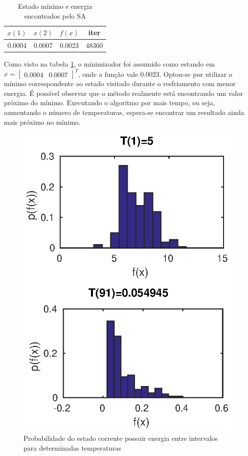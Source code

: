 \documentclass[conference,compsoc]{IEEEtran}
\begin{document}
\begin{table}[!htcb]
  \centering
  \begin{tabular}{|c|c|c|c|}
    \hline
    \rowcolor{kugray5}     $x(1)$   &    $x(2)$   &    $f(x)$    &   iter \\ \hline
		  				   0.0004	&    0.0007	  &    0.0023	 &   48360 \\ \hline
	\end{tabular}
  \caption{Estado mínimo e energia encontrados pelo SA}
  \label{tab:min_SA}
\end{table}

Como visto na tabela \ref{tab:min_SA}, o minimizador foi assumido como estando em $x= \begin{bmatrix}0.0004&0.0007\end{bmatrix}^T$, onde a função vale 0.0023. Optou-se por utilizar o mínimo correspondente ao estado visitado durante o resfriamento com menor energia. É possível observar que o método realmente está encontrando um valor próximo do mínimo. Executando o algoritmo por mais tempo, ou seja, aumentando o número de temperaturas, espera-se encontrar um resultado ainda mais próximo no mínimo.

\begin{figure}[!htcb]
\centering
\includegraphics[scale=0.80]{SA_ackley_P.eps}
\caption{Probabilidade do estado corrente possuir energia entre intervalos para determinadas temperaturas}
\label{fig:SA_ackley_P}
\end{figure}
\end{document}
